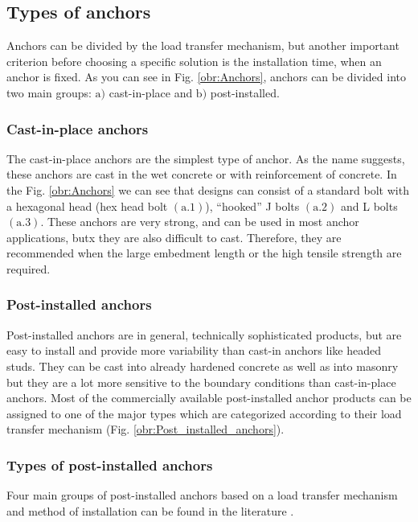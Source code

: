 \newpage
\subsection{Types of anchors}
\indent

Anchors can be divided by the load transfer mechanism, but another important criterion before choosing a specific solution is the installation time, when an anchor is fixed. As you can see in Fig. \ref{obr:Anchors}, anchors can be divided into two main groups: $\mathrm{a)}$ cast-in-place and $\mathrm{b)}$ post-installed. 


\subsubsection{Cast-in-place anchors}
The cast-in-place anchors are the simplest type of anchor. As the name suggests, these anchors are cast in the wet concrete or with reinforcement of concrete. In the Fig. \ref{obr:Anchors} we can see that designs can consist of a standard bolt with a hexagonal head (hex head bolt $\mathrm{(a.1)}$), “hooked” J bolts  $\mathrm{(a.2)}$ and L bolts $\mathrm{(a.3)}$. These anchors are very strong, and can be used in most anchor applications, butx they are also difficult to cast. Therefore, they are recommended when the large embedment length or the high tensile strength are required.

\subsubsection{Post-installed anchors}
Post-installed anchors are in general, technically sophisticated products, but are easy to install and provide more variability than cast-in anchors like headed studs. They can be cast into already hardened concrete as well as into masonry but they are a lot more sensitive to the boundary conditions than cast-in-place anchors. Most of the commercially available post-installed anchor products can be assigned to one of the major types which are categorized according to their load transfer mechanism (Fig. \ref{obr:Post_installed_anchors}).


\subsubsection{Types of post-installed anchors}
Four main groups of post-installed anchors based on a load transfer mechanism and method of installation can be found in the literature \cite{hilti_anchors}.
 
